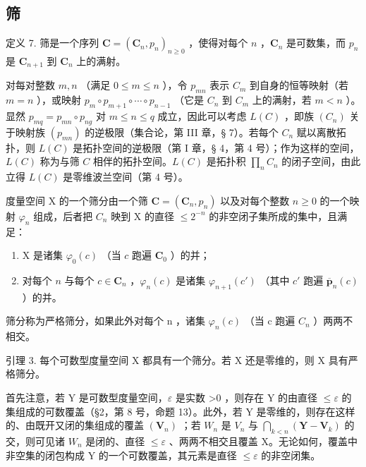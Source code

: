 \subsection{筛}

定义 7. 筛是一个序列 \(\mathbf{C} = (\mathbf{C}_n, p_n)_{n \geqslant 0}\) ，使得对每个 \(n\) ，\(\mathbf{C}_n\) 是可数集，而 \(p_n\) 是 \(\mathbf{C}_{n+1}\) 到 \(\mathbf{C}_n\) 上的满射。

对每对整数 \(m, n\) （满足 \(0 \leqslant m \leqslant n\) ），令 \(p_{mn}\) 表示 \(C_m\) 到自身的恒等映射（若 \(m = n\) ），或映射 \(p_m \circ p_{m+1} \circ \cdots \circ p_{n-1}\) （它是 \(C_n\) 到 \(C_m\) 上的满射，若 \(m < n\) ）。显然 \(p_{mq} = p_{mn} \circ p_{ng}\) 对 \(m \leqslant n \leqslant q\) 成立，因此可以考虑 \(L(C)\) ，即族 \((C_n)\) 关于映射族 \((p_{mn})\) 的逆极限（集合论，第 III 章，§ 7）。若每个 \(C_n\) 赋以离散拓扑，则 \(L(C)\) 是拓扑空间的逆极限（第 I 章，§ 4，第 4 号）；作为这样的空间，\(L(C)\) 称为与筛 \(C\) 相伴的拓扑空间。\(L(C)\) 是拓扑积 \(\prod_n C_n\) 的闭子空间，由此立得 \(L(C)\) 是零维波兰空间（第 4 号）。

度量空间 X 的一个筛分由一个筛 \(\mathbf{C} = (\mathbf{C}_{n}, p_{n})\) 以及对每个整数 \(n \geqslant 0\) 的一个映射 \(\varphi_{n}\) 组成，后者把 \(C_{n}\) 映到 X 的直径 \(\leqslant 2^{-n}\) 的非空闭子集所成的集中，且满足：

\begin{enumerate}
\def\labelenumi{\alph{enumi})}
\item
  X 是诸集 \(\varphi_0(c)\) （当 \(c\) 跑遍 \(\mathbf{C}_0\) ）的并；
\item
  对每个 \(n\) 与每个 \(c \in \mathbf{C}_n\) ，\(\varphi_n(c)\) 是诸集 \(\varphi_{n+1}(c')\) （其中 \(c'\) 跑遍 \(\overline{\pmb{p}}_n(c)\) ）的并。
\end{enumerate}

筛分称为严格筛分，如果此外对每个 n ，诸集 \(\varphi_{n}(c)\) （当 c 跑遍 \(C_{n}\) ）两两不相交。

引理 3. 每个可数型度量空间 X 都具有一个筛分。若 X 还是零维的，则 X 具有严格筛分。

首先注意，若 Y 是可数型度量空间，\(\varepsilon\) 是实数 \textgreater0 ，则存在 Y 的由直径 \(\leqslant\varepsilon\) 的集组成的可数覆盖（§2，第 8 号，命题 13）。此外，若 Y 是零维的，则存在这样的、由既开又闭的集组成的覆盖 \((\mathbf{V}_{n})\) ；若 \(W_{n}\) 是 \(V_{n}\) 与 \(\bigcap_{k<n}(\mathbf{Y}-\mathbf{V}_{k})\) 的交，则可见诸 \(W_{n}\) 是闭的、直径 \(\leqslant\varepsilon\) 、两两不相交且覆盖 X。无论如何，覆盖中非空集的闭包构成 Y 的一个可数覆盖，其元素是直径 \(\leqslant\varepsilon\) 的非空闭集。

